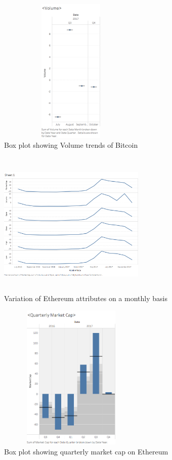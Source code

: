 \documentclass{article}
\begin{document}
\vfill
\begin{figure}

    \centering
    \includegraphics[width = 7cm,height=7cm]{Sheet3.png}
    \caption{Box plot showing Volume trends of Bitcoin}
    \label{fig:my_label}
    
\end{figure}

\vfill
\begin{figure}

    \centering
    \includegraphics[width = 7cm,height=7cm]{Sheet21.png}
    \caption{Variation of Ethereum attributes on a monthly basis }
    \label{fig:my_label}
    
\end{figure}

\vfill
\begin{figure}

    \centering
    \includegraphics[width = 7cm,height=7cm]{Sheet22.png}
    \caption{Box plot showing quarterly market cap on Ethereum}
    \label{fig:my_label}
    
\end{figure}
\end{document}
